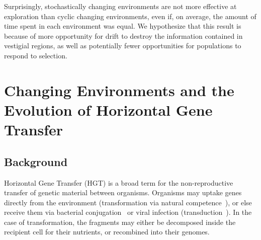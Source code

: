 \documentclass[PhD]{msu-thesis}
\begin{document}
Surprisingly, stochastically changing environments are not more effective at exploration
than cyclic changing environments, even if, on average, the amount of time spent in each environment was equal. We hypothesize that this result is because of more opportunity for drift to destroy the information contained in vestigial regions, as well as potentially fewer opportunities for populations to respond to selection.





\chapter{Changing Environments and the Evolution of Horizontal Gene Transfer}
\label{chap:evo-hgt}
\section{Background}

Horizontal Gene Transfer (HGT) is a broad term for the non-reproductive transfer of genetic material between organisms. Organisms may uptake genes directly from the environment (transformation via natural competence~\cite{chen_dna_2004}), or else receive them via bacterial conjugation~\cite{lederberg_gene_1946} or viral infection (transduction~\cite{zinder_genetic_1952,lennox_transduction_1955}). In the case of transformation, the fragments may either be decomposed inside the recipient cell for their nutrients, or recombined into their genomes. 
\end{document}
